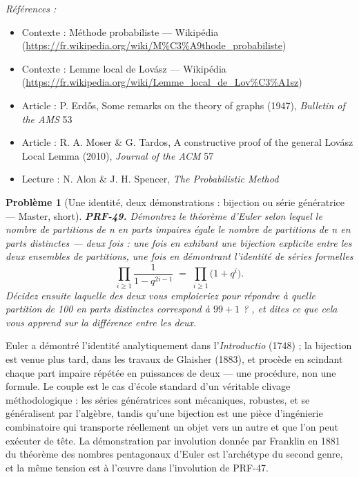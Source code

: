 \documentclass[11pt]{article}
\newtheorem{problem}{Problème}
\newenvironment{refs}{\par\small\noindent\emph{Références :}\begin{itemize}\setlength\itemsep{0pt}}{\end{itemize}\normalsize}
\begin{document}
\begin{refs}
\item Contexte : Méthode probabiliste --- Wikipédia (\url{https://fr.wikipedia.org/wiki/M%C3%A9thode_probabiliste})
\item Contexte : Lemme local de Lovász --- Wikipédia (\url{https://fr.wikipedia.org/wiki/Lemme_local_de_Lov%C3%A1sz})
\item Article : P. Erd\H{o}s, \og{} Some remarks on the theory of graphs \fg{} (1947), \textit{Bulletin of the AMS} 53
\item Article : R. A. Moser \& G. Tardos, \og{} A constructive proof of the general Lovász Local Lemma \fg{} (2010), \textit{Journal of the ACM} 57
\item Lecture : N. Alon \& J. H. Spencer, \textit{The Probabilistic Method}
\end{refs}

\bigskip

\begin{problem}[{Une identité, deux démonstrations : bijection ou série génératrice --- Master, short}]
\textbf{PRF-49.} Démontrez le théorème d'Euler selon lequel le nombre
de partitions de n en parts impaires égale le nombre de partitions de n en parts distinctes
--- deux fois : une fois en exhibant une bijection explicite entre les deux ensembles de
partitions, une fois en démontrant l'identité de séries formelles
\[ \prod_{i \ge 1} \frac{1}{1 - q^{2i-1}} \;=\; \prod_{i \ge 1} \bigl(1 + q^{i}\bigr). \]
Décidez ensuite laquelle des deux vous emploieriez pour répondre à \og{} quelle partition de 100
en parts distinctes correspond à $ 99 + 1 $ ? \fg{}, et dites ce que cela vous apprend sur la
différence entre les deux.
\end{problem}

\noindent Euler a démontré l'identité analytiquement dans l'\textit{Introductio}
(1748) ; la bijection est venue plus tard, dans les travaux de Glaisher (1883), et procède en
scindant chaque part impaire répétée en puissances de deux --- une procédure, non une formule.
Le couple est le cas d'école standard d'un véritable clivage méthodologique : les séries
génératrices sont mécaniques, robustes, et se généralisent par l'algèbre, tandis qu'une
bijection est une pièce d'ingénierie combinatoire qui transporte réellement un objet vers un
autre et que l'on peut exécuter de tête. La démonstration par involution donnée par Franklin
en 1881 du théorème des nombres pentagonaux d'Euler est l'archétype du second genre, et la
même tension est à l'\oe{}uvre dans l'involution de PRF-47.
\end{document}
